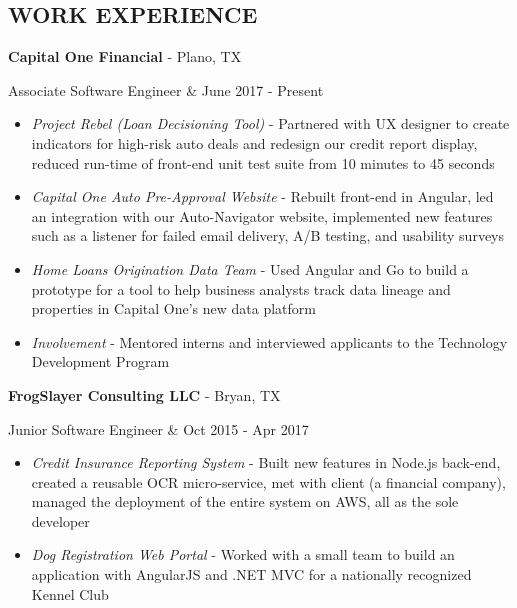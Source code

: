 \documentclass[margin,10pt]{res} %
\begin{document}
\begin{resume}
\section{WORK EXPERIENCE}   
				{\bf Capital One Financial} - Plano, TX \\ 
                \begin{ncolumn}{2} %
                Associate Software Engineer &  \hfill June 2017 - Present
                \end{ncolumn}
                \begin{itemize}           
                \item \textit{Project Rebel (Loan Decisioning Tool)} - Partnered with UX designer to create indicators for high-risk auto deals and redesign our credit report display, reduced run-time of front-end unit test suite from 10 minutes to 45 seconds
                \item \textit{Capital One Auto Pre-Approval Website} - Rebuilt front-end in Angular, led an integration with our Auto-Navigator website, implemented new features such as a listener for failed email delivery, A/B testing, and usability surveys
                \item \textit{Home Loans Origination Data Team} - Used Angular and Go to build a prototype for a tool to help business analysts track data lineage and properties in Capital One's new data platform
                \item \textit{Involvement} - Mentored interns and interviewed applicants to the Technology Development Program
                \end{itemize}
				{\bf FrogSlayer Consulting LLC} - Bryan, TX \\ 
                \begin{ncolumn}{2} %
                Junior Software Engineer &  \hfill Oct 2015 - Apr 2017
                \end{ncolumn}
                \begin{itemize}           
                \item \textit{Credit Insurance Reporting System} - Built new features in Node.js back-end, created a reusable OCR micro-service, met with client (a financial company), managed the deployment of the entire system on AWS, all as the sole developer
                \item \textit{Dog Registration Web Portal} - Worked with a small team to build an application with AngularJS and .NET MVC for a nationally recognized Kennel Club 

\end{itemize}
\end{resume}
\end{document}
